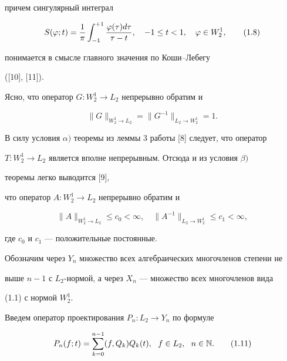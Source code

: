 причем сингулярный интеграл


\begin{equation}


S(\vp;t)=\frac{1}{\pi}\int_{-1}^{+1}\frac{\vp(\tau)d\tau}{\tau-t},\quad -1


\le t<1,\quad\vp\in W^1_2,


\tag{1.8}


\end{equation}


понимается в смысле главного значения по Коши--Лебегу


([10], [11]).





Ясно, что оператор $G:W^1_2\to L_2$ непрерывно обратим и 


\begin{equation}


\|G\|_{W^1_2\to L_2}=\|G^{-1}\|_{L_2\to W^1_2}=1.


\tag{1.9}


\end{equation}


В силу условия $\alpha)$ теоремы из леммы 3 работы [8] следует, что оператор


$T:W^1_2\to L_2$ является вполне непрерывным. Отсюда и из условия $\beta)$ 


теоремы легко выводится [9], 


что оператор $A:W^1_2\to L_2$ непрерывно обратим и


\begin{equation}


\|A\|_{W^1_2\to L_2}\le c_0<\infty,\quad\|A^{-1}\|_{L_2\to W^1_2}\le c_1<


\infty,


\tag{1.10}


\end{equation}


где $c_0$ и $c_1$ --- положительные постоянные.





Обозначим через $Y_n$ множество всех алгебраических многочленов степени не 


выше $n-1$ с $L_2$-нормой, а через $X_n$ --- множество всех многочленов вида 


(1.1) с нормой $W^1_2$.


Введем оператор проектирования $P_n:L_2\to Y_n$ по формуле


\begin{equation}


P_n(f;t)=\sum_{k=0}^{n-1}(f,Q_k)Q_k(t),\ \ f\in L_2,\ \ n\in\N.


\tag{1.11}


\end{equation}



